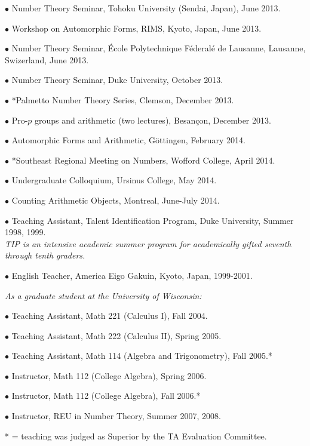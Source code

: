 \documentclass{article}
\newcommand{\categorywidth}{1in}        %
\newcommand{\infowidth}{5.8in}          %
\newcommand{\categorysep}{5pt}
\newcommand{\catlistlabel}[1]%
{\raisebox{0pt}[1ex][0pt]{\makebox[\labelwidth][l]%
    {\parbox[t]{\labelwidth}{\hspace{0pt}\textbf{#1}}}}}
\newenvironment{categories}{\begin{list}{}{
      \setlength{\labelwidth}{\categorywidth}
      \setlength{\leftmargin}{\labelwidth}
      \addtolength{\leftmargin}{\labelsep}
      \setlength{\topsep}{20pt}
      \setlength{\itemsep}{\categorysep}
      \renewcommand{\makelabel}{\catlistlabel}
      }}{\end{list}}
\newcommand{\category}[1]{\item[#1]}
\newcommand{\rawentry}[1]{{\begin{minipage}[t]{\infowidth}{#1}
    \end{minipage}}}
\begin{document}
\begin{flushleft}
\begin{categories}
$\bullet$ Number Theory Seminar,
Tohoku University (Sendai, Japan), June 2013.

$\bullet$
Workshop on Automorphic Forms, RIMS, Kyoto, Japan, June 2013.

$\bullet$ Number Theory Seminar,
\'Ecole Polytechnique F\'ederal\'e de Lausanne, Lausanne, Swizerland, June 2013.

$\bullet$ Number Theory Seminar,
Duke University, October 2013.

$\bullet$ *Palmetto Number Theory Series, Clemson, December 2013.

$\bullet$ 
Pro-$p$ groups and arithmetic (two lectures), Besan\c{c}on, December 2013.

$\bullet$ Automorphic Forms and Arithmetic, G\"ottingen, February 2014.

$\bullet$ *Southeast Regional Meeting on Numbers, Wofford College, April 2014.

$\bullet$ Undergraduate Colloquium, Ursinus College, May 2014.

$\bullet$ Counting Arithmetic Objects, Montreal, June-July 2014.


  \category{Teaching \\ Experience}

  $\bullet$ {Teaching Assistant, Talent Identification Program, Duke University, Summer 1998, 1999. \\
  \itshape TIP is an intensive academic summer program for academically gifted seventh through
tenth graders. \upshape}

  $\bullet$ {English Teacher, America Eigo Gakuin, Kyoto, Japan, 1999-2001.}

  \rawentry{\itshape As a graduate student at the University of Wisconsin:}

  $\bullet$ {Teaching Assistant, Math 221 (Calculus I), Fall 2004.}

  $\bullet$ {Teaching Assistant, Math 222 (Calculus II), Spring 2005.}

  $\bullet$ {Teaching Assistant, Math 114 (Algebra and Trigonometry), Fall 2005.*}

  $\bullet$ {Instructor, Math 112 (College Algebra), Spring 2006.}

  $\bullet$ {Instructor, Math 112 (College Algebra), Fall 2006.* }

  $\bullet$ {Instructor, REU in Number Theory, Summer 2007, 2008.}

  \rawentry{* = teaching was judged as Superior by the TA Evaluation Committee.}


\end{categories}
\end{flushleft}
\end{document}
